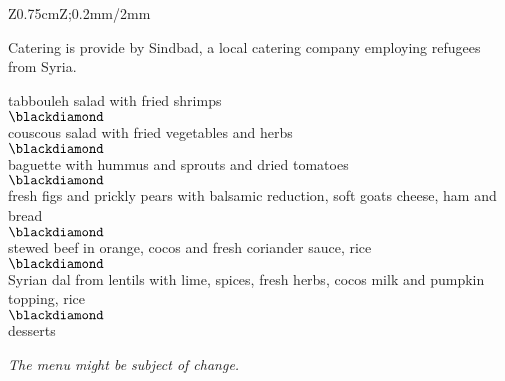 \begin{landscape}
\begin{center}
\begin{tabular}{Z{0.75cm}Z{\socialEventBoxWidth};{0.2mm/2mm}}
\begin{minipage}[t]{\socialEventBoxWidth}
\begin{minipage}[t]{0.47\linewidth}
          \vspace{\baselineskip}
          Catering is provide by Sindbad, a local catering company employing refugees from Syria.
        \end{minipage}
        \hfill
        \noindent\begin{minipage}[t]{0.47\linewidth}
          \begin{center}
            \noindent tabbouleh salad with fried shrimps\\
            $\blackdiamond$\\
            couscous salad with fried vegetables and herbs\\
            $\blackdiamond$\\
            baguette with hummus and sprouts and dried tomatoes\\
            $\blackdiamond$\\
            fresh figs and prickly pears with balsamic reduction, soft goats cheese, ham and bread\\
            $\blackdiamond$\\
            stewed beef in orange, cocos and fresh coriander sauce, rice\\
            $\blackdiamond$\\
            Syrian dal from lentils with lime, spices, fresh herbs, cocos milk and pumpkin topping, rice\\
            $\blackdiamond$\\
            desserts

            \noindent \emph{The menu might be subject of change.}
          \end{center}
        \end{minipage}
      \end{minipage}
      \vspace{0.4\multicolsep}
      \tabularnewline
    \end{tabular}
  \end{center}
  \newpage
\end{landscape}
\renewcommand{\arraystretch}{1.0}
